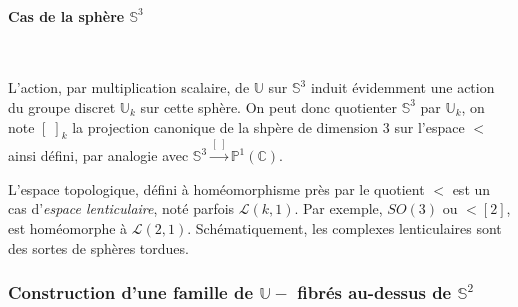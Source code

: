 \paragraph{Cas de la sph\`ere $\mathbb{S}^3$}~\\
\par
L'action, par multiplication scalaire, de $\mathbb{U}$ sur $\mathbb{S}^3$ induit \'evidemment une action du groupe discret $\mathbb{U}_k$ sur cette sph\`ere. %
On peut donc quotienter $\mathbb{S}^3$ par $\mathbb{U}_k$, on note $[\; ]_k$ la projection canonique de la shp\`ere de dimension $3$ sur l'espace $\lt$ ainsi d\'efini, %
par analogie avec $\mathbb{S}^3\xrightarrow{[\; ]}\mathbb{P}^1(\mathbb{C})$.
\par
L'espace topologique, d\'efini \`a hom\'eomorphisme pr\`es par le quotient $\lt$ est un cas d'\emph{espace lenticulaire}, not\'e parfois $\mathcal{L}(k,1)$. %
Par exemple, $SO(3)$ ou $\lt[2]$, est hom\'eomorphe \`a $\mathcal{L}(2,1)$. Sch\'ematiquement, les complexes lenticulaires sont des sortes de \og{}sph\`eres tordues\fg{}.

\subsubsection{Construction d'une famille de $\mathbb{U}-$ fibr\'es au-dessus de $\mathbb{S}^2$}\label{lt1}

